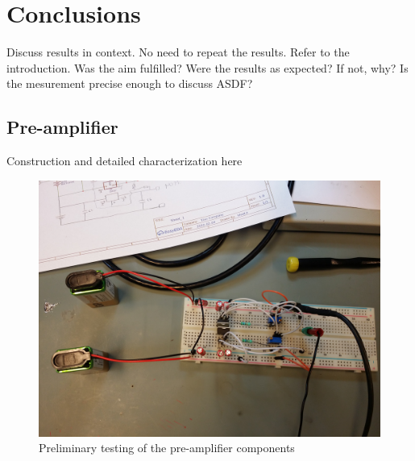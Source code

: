 \documentclass[a4paper]{article}
\begin{document}
\section{Conclusions}
Discuss results in context.
No need to repeat the results.
Refer to the introduction.
Was the aim fulfilled?
Were the results as expected? If not, why?
Is the mesurement precise enough to discuss ASDF?


\clearpage
\begin{appendices}

\section{Pre-amplifier}
\label{pre_amp}

Construction and detailed characterization here

\begin{figure}[ht!]
\centering
\includegraphics[width=\textwidth]{fig/IMG_20201005_104331.jpg}
\caption{Preliminary testing of the pre-amplifier components}
\end{figure}



\end{appendices}
\end{document}
